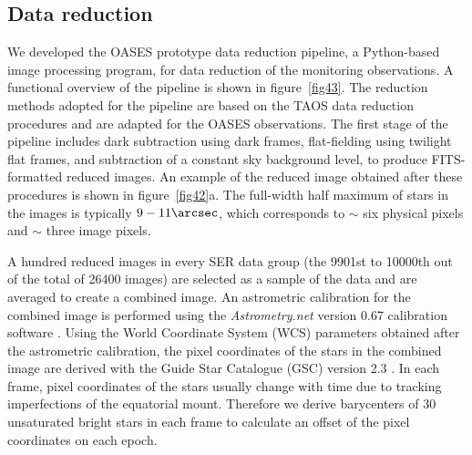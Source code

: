 \documentclass{pasj01}
\begin{document}
\subsection{Data reduction}

We developed the OASES prototype data reduction pipeline, 
a Python-based image processing program, for data reduction of the monitoring observations.
A functional overview of the pipeline
is shown in figure~\ref{fig43}.
The reduction methods adopted for the pipeline  
are based on the TAOS data reduction procedures \citep{zhang09}
and are adapted for the OASES observations.
The first stage of the pipeline includes dark subtraction using dark frames, 
flat-fielding using twilight flat frames, and subtraction of a constant sky background level, 
to produce FITS-formatted reduced images.
An example of the reduced image obtained 
after these procedures is shown in figure~\ref{fig42}a.
The full-width half maximum of stars in the images is typically $9 - 11\arcsec$,
which corresponds to $\sim$ six physical pixels and $\sim$ three image pixels.

A hundred reduced images in every SER data group (the 9901st to 10000th out of the total of 26400 images)
are selected as a sample of the data and are averaged to create a combined image.
An astrometric calibration for the combined image is performed using the {\it Astrometry.net} version 0.67 calibration software 
\citep{lang10}.
Using the World Coordinate System (WCS) parameters obtained after the astrometric calibration,
the pixel coordinates of the stars in the combined image are derived 
with the Guide Star Catalogue (GSC) version 2.3 \citep{lasker08}.
In each frame, pixel coordinates of the stars usually 
change with time due to tracking imperfections of the equatorial mount.
Therefore we derive barycenters of 30 unsaturated bright stars in each frame
to calculate an offset of the pixel coordinates on each epoch. 
\end{document}
